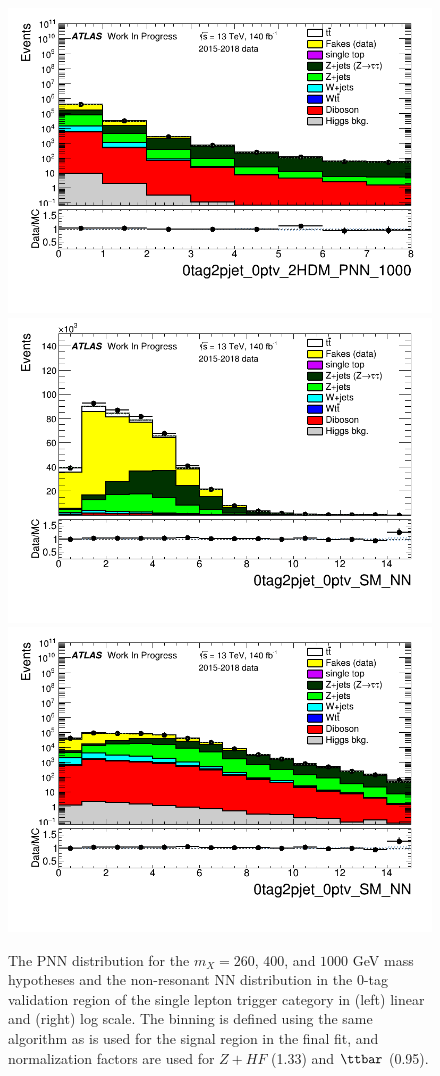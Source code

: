 \begin{figure}
\includegraphics[width=.45\textwidth]{figures/lephadFF/SLT/0tag2pjet_0ptv_2HDM_PNN_1000_SLT_ALLFAKES_Bulb_noNeg_log.png}\\
\includegraphics[width=.45\textwidth]{figures/lephadFF/SLT/0tag2pjet_0ptv_SM_NN_SLT_ALLFAKES_Bulb_noNeg_lin.png}
\includegraphics[width=.45\textwidth]{figures/lephadFF/SLT/0tag2pjet_0ptv_SM_NN_SLT_ALLFAKES_Bulb_noNeg_log.png}
\caption{The PNN distribution for the $m_{X} = 260$, $400$, and $1000$ GeV mass hypotheses and the non-resonant NN distribution in the $0$-tag validation region of the single lepton trigger category in (left) linear and (right) log scale. The binning is defined using the same algorithm as is used for the signal region in the final fit, and normalization factors are used for $Z+HF$ (1.33) and $\ttbar$ (0.95).}
\label{fig:SLT_0tag}
\end{figure}    

